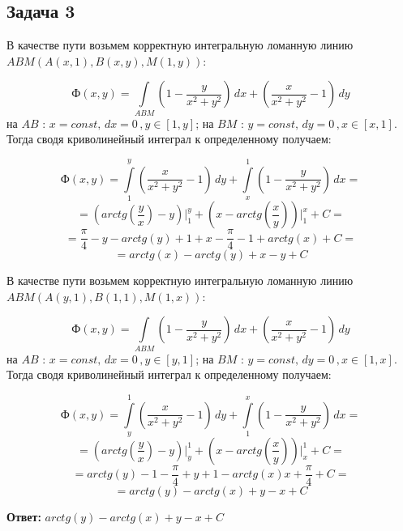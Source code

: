 \documentclass[12pt]{article}
\begin{document}
	\subsection*{Задача 3}
	В качестве пути возьмем корректную интегральную ломанную линию \\$ ABM(A(x,1),B(x,y),M(1,y)) $:

	$$ Ф(x,y) = \int \limits_{ABM} (1-\frac{y}{x^2+y^2})\,dx + (\frac{x}{x^2+y^2}-1)\, dy $$
	на $ AB $ : $ x = const, \, dx = 0\, , y\in [1,y] $; на $ BM $ : $ y = const, \, dy = 0\, , x\in [x,1] $. Тогда сводя криволинейный интеграл к определенному получаем:

	$$ Ф(x,y) = \int \limits_1^y (\frac{x}{x^2+y^2}-1)\, dy + \int \limits_x^1 (1-\frac{y}{x^2+y^2})\,dx = $$
	$$ = (arctg(\frac{y}{x}) - y)\Big|_1^y + (x - arctg(\frac{x}{y}))\Big|_1^x + C = $$
	$$ = \frac{\pi}{4} - y - arctg(y) + 1 + x - \frac{\pi}{4} - 1 + arctg(x) + C = $$
	$$ = arctg(x) - arctg(y) + x - y + C $$

	В качестве пути возьмем корректную интегральную ломанную линию \\$ ABM(A(y,1),B(1,1),M(1,x)) $:

	$$ Ф(x,y) = \int \limits_{ABM} (1-\frac{y}{x^2+y^2})\,dx + (\frac{x}{x^2+y^2}-1)\, dy $$
	на $ AB $ : $ x = const, \, dx = 0\, , y\in [y,1] $; на $ BM $ : $ y = const, \, dy = 0\, , x\in [1,x] $. Тогда сводя криволинейный интеграл к определенному получаем:

	$$ Ф(x,y) = \int \limits_y^1 (\frac{x}{x^2+y^2}-1)\, dy + \int \limits_1^x (1-\frac{y}{x^2+y^2})\,dx = $$
	$$ = (arctg(\frac{y}{x}) - y)\Big|_y^1 + (x - arctg(\frac{x}{y}))\Big|_x^1 + C = $$
	$$ = arctg(y) - 1 -  \frac{\pi}{4} + y + 1 - arctg(x) x + \frac{\pi}{4} + C = $$
	$$ = arctg(y) - arctg(x) + y - x + C $$

	\hspace{240pt}\textbf{Ответ:} $ arctg(y) - arctg(x) + y - x + C $
	
\end{document}
